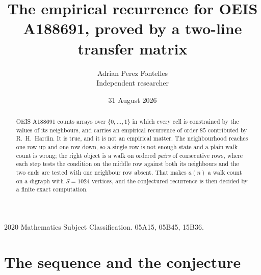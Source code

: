 \documentclass[11pt,a4paper]{article}
\title{The empirical recurrence for OEIS A188691, proved by a two-line transfer matrix}
\author{Adrian Perez Fontelles\\ \small Independent researcher}
\date{31 August 2026}
\theoremstyle{plain}
\theoremstyle{definition}
\begin{document}
\maketitle

\begin{abstract}
OEIS A188691 counts arrays over $\{0,\dots,1\}$ in which every cell is constrained by the
values of its neighbours, and carries an empirical recurrence of order $85$ contributed
by R.~H.~Hardin. It is true, and it is not an empirical matter. The neighbourhood reaches one
row up and one row down, so a single row is not enough state and a plain walk count
is wrong; the right object is a walk on ordered \emph{pairs} of consecutive rows, where
each step tests the condition on the middle row against both its neighbours and the two
ends are tested with one neighbour row absent. That makes $a(n)$ a walk count on a digraph
with $S=1024$ vertices, and the conjectured recurrence is then decided by a finite exact
computation.
\end{abstract}

\noindent\small 2020 Mathematics Subject Classification. 05A15, 05B45, 15B36.\normalsize

\section{The sequence and the conjecture}
\end{document}
